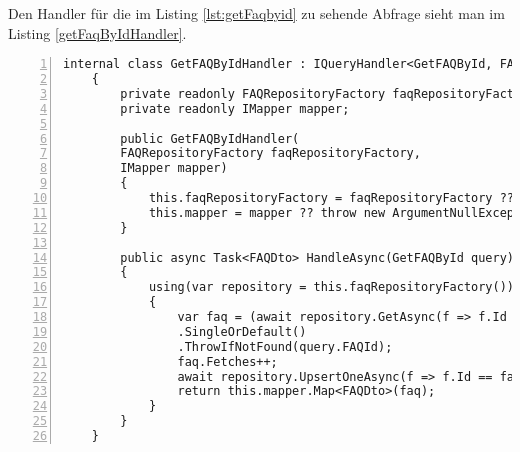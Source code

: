 Den Handler für die im Listing \ref{lst:getFaqbyid} zu sehende Abfrage sieht man im Listing \ref{getFaqByIdHandler}.
\begin{lstlisting}[caption={CQS-Handler Beispiel},captionpos=b, numbers=left, backgroundcolor=\color{black!10},language={[Sharp]C}, label={getFaqByIdHandler}]
	internal class GetFAQByIdHandler : IQueryHandler<GetFAQById, FAQDto>
	{
		private readonly FAQRepositoryFactory faqRepositoryFactory;
		private readonly IMapper mapper;
		
		public GetFAQByIdHandler(
		FAQRepositoryFactory faqRepositoryFactory,
		IMapper mapper)
		{
			this.faqRepositoryFactory = faqRepositoryFactory ?? throw new ArgumentNullException(nameof(faqRepositoryFactory));
			this.mapper = mapper ?? throw new ArgumentNullException(nameof(mapper));
		}
		
		public async Task<FAQDto> HandleAsync(GetFAQById query)
		{
			using(var repository = this.faqRepositoryFactory())
			{
				var faq = (await repository.GetAsync(f => f.Id == query.FAQId))
				.SingleOrDefault()
				.ThrowIfNotFound(query.FAQId);
				faq.Fetches++;
				await repository.UpsertOneAsync(f => f.Id == faq.Id, faq);
				return this.mapper.Map<FAQDto>(faq);
			}
		}
	}
\end{lstlisting}